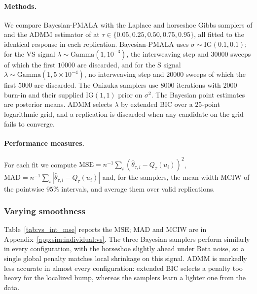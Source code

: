\paragraph{Methods.} We compare Bayesian-PMALA with the Laplace and horseshoe Gibbs samplers of \citet{onizuka2024fast} and the ADMM estimator of \citet{brantley2020baseline} at $\tau\in\{0.05,0.25,0.50,0.75,0.95\}$, all fitted to the identical response in each replication. Bayesian-PMALA uses $\sigma\sim\mathrm{IG}(0.1,0.1)$; for the VS signal $\lambda\sim\mathrm{Gamma}(1,10^{-3})$, the interweaving step and $30000$ sweeps of which the first $10000$ are discarded, and for the S signal $\lambda\sim\mathrm{Gamma}(1,5\times10^{-4})$, no interweaving step and $20000$ sweeps of which the first $5000$ are discarded. The Onizuka samplers use $8000$ iterations with $2000$ burn-in and their supplied $\mathrm{IG}(1,1)$ prior on $\sigma^2$. The Bayesian point estimates are posterior means. ADMM selects $\lambda$ by extended BIC over a $25$-point logarithmic grid, and a replication is discarded when any candidate on the grid fails to converge.

\paragraph{Performance measures.} For each fit we compute $\mathrm{MSE}=n^{-1}\sum_i(\widehat\theta_{\tau,i}-Q_\tau(u_i))^2$, $\mathrm{MAD}=n^{-1}\sum_i|\widehat\theta_{\tau,i}-Q_\tau(u_i)|$ and, for the samplers, the mean width MCIW of the pointwise $95\%$ intervals, and average them over valid replications.

\subsubsection{Varying smoothness}
\label{sec:sim:ind:vs}

Table~\ref{tab:vs_int_mse} reports the MSE; MAD and MCIW are in Appendix~\ref{app:sim:individual:vs}. The three Bayesian samplers perform similarly in every configuration, with the horseshoe slightly ahead under Beta noise, so a single global penalty matches local shrinkage on this signal. ADMM is markedly less accurate in almost every configuration: extended BIC selects a penalty too heavy for the localized bump, whereas the samplers learn a lighter one from the data.

